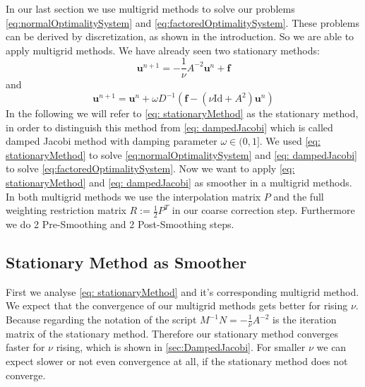 \documentclass{amsart}
\theoremstyle{definition}
\theoremstyle{remark}
\numberwithin{equation}{section}
\newcommand{\Id}{\mathrm{Id}}
\renewcommand{\vec}{\textbf}
\begin{document}
In our last section we use multigrid methods to solve our problems \eqref{eq:normalOptimalitySystem} and \ref{eq:factoredOptimalitySystem}. These problems can be derived by discretization, as shown in the introduction. So we are able to apply multigrid methods. We have already seen two stationary methods:
\begin{equation}
\vec{u}^{n+1}    = - \frac{1}{\nu} A^{-2} \vec{u}^n+ \vec{f}
\label{eq: stationaryMethod}
\end{equation}
and 
\begin{equation}
\vec{u}^{n+1}    =  \vec{u}^n+ \omega D^{-1}  (\vec{f} - (\nu \Id + A^2) \vec{u}^n)
\label{eq: dampedJacobi}
\end{equation}
In the following we will refer to \eqref{eq: stationaryMethod} as the stationary method, in order to distinguish this method from \eqref{eq: dampedJacobi} which is called damped Jacobi method with damping parameter $\omega \in (0,1] $. We used \eqref{eq: stationaryMethod} to solve  \eqref{eq:normalOptimalitySystem} and \eqref{eq: dampedJacobi} to solve \eqref{eq:factoredOptimalitySystem}. Now we want to apply \eqref{eq: stationaryMethod} and \eqref{eq: dampedJacobi} as smoother in a multigrid methods. In both multigrid methods we use the interpolation matrix $P$ and the full weighting restriction matrix $R:= \frac{1}{2} P^T$  in our coarse correction step. Furthermore we do 2 Pre-Smoothing and 2 Post-Smoothing steps. 
\subsection{Stationary Method as Smoother}
First we analyse \eqref{eq: stationaryMethod} and it's corresponding multigrid method. We expect that the convergence of our multigrid methods gets better for rising $\nu$. Because regarding the notation of the script $M^{-1} N = - \frac{1}{\nu} A^{-2} $ is the iteration matrix of the stationary method. Therefore our stationary method converges faster for $\nu $ rising, which is shown in \ref{sec:DampedJacobi}. For smaller $\nu$ we can expect slower or not even convergence at all, if the stationary method does not converge. 
\end{document}
